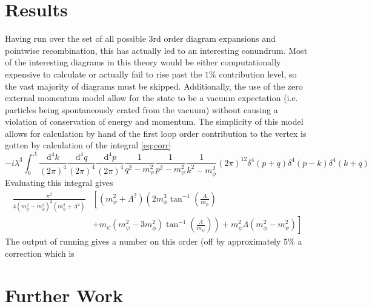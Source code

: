 \documentclass{article}
\newcommand{\dd}{\textrm{d}}
\begin{document}
\section{Results}
\hspace{0.5 cm} Having run over the set of all possible 3rd order diagram expansions and pointwise recombination, this has actually led to an interesting conundrum. Most of the interesting diagrams in this theory would be either computationally expensive to calculate or actually fail to rise past the $1\%$ contribution level, so the vast majority of diagrams must be skipped. 
Additionally, the use of the zero external momentum model allow for the state to be a vacuum expectation (i.e. particles being spontaneously crated from the vacuum) without causing a violation of conservation of energy and momentum.  
The simplicity of this model allows for calculation by hand of the first loop order contribution to the vertex is gotten by calculation of the integral \ref{eq:corr}
\begin{equation}
	-i \lambda^3 \int_0^\Lambda \frac{\dd^4 k}{(2\pi)^4} \frac{\dd^4 q}{(2 \pi)^4 }\frac{\dd^4 p}{(2 \pi)^4}\frac{1}{q^2 -m_{\psi}^2} \frac{1}{p^2-m_{\psi}^2} \frac{1}{k^2-m_{\phi}^2} (2\pi)^{12} \delta^4(p+q) \delta^4(p-k) \delta^4(k+q)  
\label{eq:corr}
\end{equation}
Evaluating this integral gives 
\begin{equation}
	\begin{split}
		\frac{\pi^2}{4(m_\psi^2 - m_\phi^2)^2(m_\psi^2 + \Lambda^2)} & \left[ (m_\psi^2 + \Lambda^2) \left( 2 m_\phi^3 \tan^{-1} \left( \frac{\Lambda}{m_\phi} \right) \right. \right. \\
		& \left. \left. + m_\psi (m_\psi^2 - 3 m_\phi^2 ) \tan^{-1} \left( \frac{\Lambda}{m_\psi} \right) \right) + m_\psi^2 \Lambda \left( m_\phi^2 - m_\psi^2 \right) \right] 
	\end{split}
\end{equation}
The output of running gives a number on this order (off by approximately $5\%$ a correction which is 
\newpage
\section{Further Work}
\end{document}
